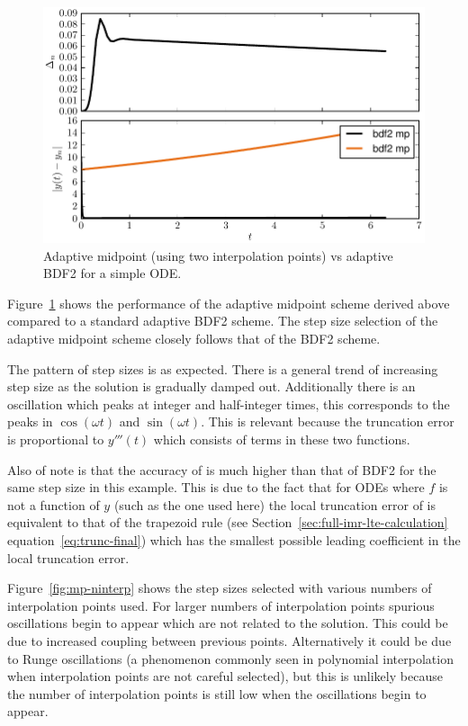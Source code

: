 \begin{figure}[ht!]
  \centering
  \includegraphics{images/bdf2_vs_mp}
  \caption{Adaptive midpoint (using two interpolation points) vs adaptive BDF2 for a simple ODE.}
  \label{fig:mp-vs-bdf2}
\end{figure}

Figure~\ref{fig:mp-vs-bdf2} shows the performance of the adaptive midpoint scheme derived above compared to a standard adaptive BDF2 scheme.\cite{Gresho-Sani} %
The step size selection of the adaptive midpoint scheme closely follows that of the BDF2 scheme.

The pattern of step sizes is as expected.
There is a general trend of increasing step size as the solution is gradually damped out.
Additionally there is an oscillation which peaks at integer and half-integer times, this corresponds to the peaks in $\cos(\omega t)$ and $\sin(\omega t)$.
This is relevant because the truncation error is proportional to $y'''(t)$ which consists of terms in these two functions.

Also of note is that the accuracy of \imr is much higher than that of BDF2 for the same step size in this example.
This is due to the fact that for ODEs where $f$ is not a function of $y$ (such as the one used here) the local truncation error of \imr is equivalent to that of the trapezoid rule (see Section~\ref{sec:full-imr-lte-calculation} equation~\eqref{eq:trunc-final}) which has the smallest possible leading coefficient in the local truncation error.\cite{Gresho-Sani} %


Figure~\ref{fig:mp-ninterp} shows the step sizes selected with various numbers of interpolation points used.
For larger numbers of interpolation points spurious oscillations begin to appear which are not related to the solution.
This could be due to increased coupling between previous points.
Alternatively it could be due to Runge oscillations (a phenomenon commonly seen in polynomial interpolation when interpolation points are not careful selected), but this is unlikely because the number of interpolation points is still low when the oscillations begin to appear.

